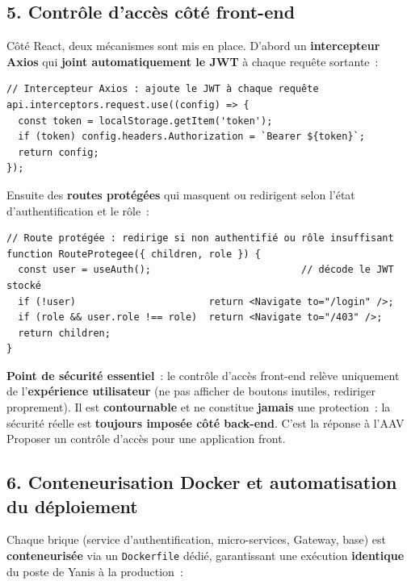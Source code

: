\vspace{0.4cm}

\subsection*{5. Contrôle d'accès côté front-end}
{}
\noindent Côté React, deux mécanismes sont mis en place. D'abord un \textbf{intercepteur Axios} qui \textbf{joint automatiquement le JWT} à chaque requête sortante~:

\begin{verbatim}
// Intercepteur Axios : ajoute le JWT à chaque requête
api.interceptors.request.use((config) => {
  const token = localStorage.getItem('token');
  if (token) config.headers.Authorization = `Bearer ${token}`;
  return config;
});
\end{verbatim}

\noindent Ensuite des \textbf{routes protégées} qui masquent ou redirigent selon l'état d'authentification et le rôle~:

\begin{verbatim}
// Route protégée : redirige si non authentifié ou rôle insuffisant
function RouteProtegee({ children, role }) {
  const user = useAuth();                          // décode le JWT stocké
  if (!user)                       return <Navigate to="/login" />;
  if (role && user.role !== role)  return <Navigate to="/403" />;
  return children;
}
\end{verbatim}

\noindent \textbf{Point de sécurité essentiel}~: le contrôle d'accès front-end relève uniquement de l'\textbf{expérience utilisateur} (ne pas afficher de boutons inutiles, rediriger proprement). Il est \textbf{contournable} et ne constitue \textbf{jamais} une protection~: la sécurité réelle est \textbf{toujours imposée côté back-end}. C'est la réponse à l'AAV \og{}Proposer un contrôle d'accès pour une application front\fg{}.

\newpage

\subsection*{6. Conteneurisation Docker et automatisation du déploiement}
{}
\noindent Chaque brique (service d'authentification, micro-services, Gateway, base) est \textbf{conteneurisée} via un \texttt{Dockerfile} dédié, garantissant une exécution \textbf{identique} du poste de Yanis à la production~:

